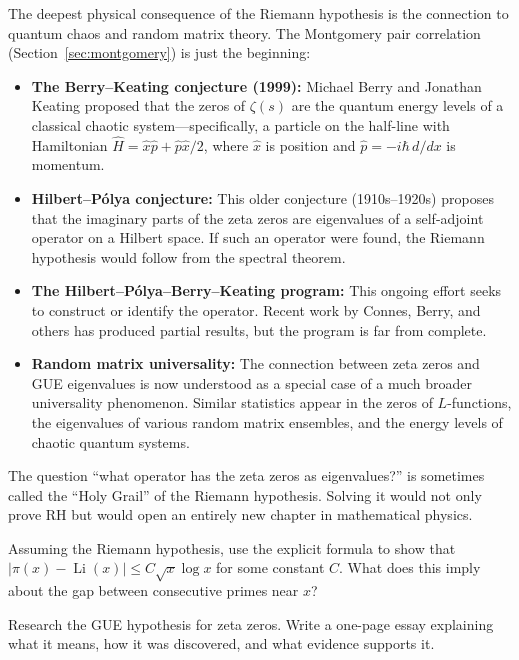 The deepest physical consequence of the Riemann hypothesis is the connection to quantum chaos and random matrix theory. The Montgomery pair correlation (Section~\ref{sec:montgomery}) is just the beginning:

\begin{itemize}
  \item \textbf{The Berry--Keating conjecture (1999):} Michael Berry and Jonathan Keating proposed that the zeros of $\zeta(s)$ are the quantum energy levels of a classical chaotic system---specifically, a particle on the half-line with Hamiltonian $\hat{H} = \hat{x}\hat{p} + \hat{p}\hat{x}/2$, where $\hat{x}$ is position and $\hat{p} = -i\hbar \, d/dx$ is momentum.
  \item \textbf{Hilbert--P\'{o}lya conjecture:} This older conjecture (1910s--1920s) proposes that the imaginary parts of the zeta zeros are eigenvalues of a self-adjoint operator on a Hilbert space. If such an operator were found, the Riemann hypothesis would follow from the spectral theorem.
  \item \textbf{The Hilbert--P\'{o}lya--Berry--Keating program:} This ongoing effort seeks to construct or identify the operator. Recent work by Connes, Berry, and others has produced partial results, but the program is far from complete.
  \item \textbf{Random matrix universality:} The connection between zeta zeros and GUE eigenvalues is now understood as a special case of a much broader universality phenomenon. Similar statistics appear in the zeros of $L$-functions, the eigenvalues of various random matrix ensembles, and the energy levels of chaotic quantum systems.
\end{itemize}

The question ``what operator has the zeta zeros as eigenvalues?'' is sometimes called the ``Holy Grail'' of the Riemann hypothesis. Solving it would not only prove RH but would open an entirely new chapter in mathematical physics.

\begin{exercise}
\label{ex:primegaps_rh}
Assuming the Riemann hypothesis, use the explicit formula to show that $|\pi(x) - \operatorname{Li}(x)| \le C \sqrt{x} \log x$ for some constant $C$. What does this imply about the gap between consecutive primes near $x$?
\end{exercise}

\begin{exercise}
\label{ex:random_matrix}
Research the GUE hypothesis for zeta zeros. Write a one-page essay explaining what it means, how it was discovered, and what evidence supports it.
\end{exercise}

